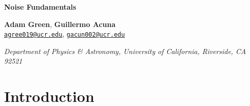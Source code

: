 \documentclass[12pt]{article}
\newcommand{\red}[1]{\textbf{\textcolor{myred1}{#1}}} %
\newcommand{\email}[1]{\href{mailto:#1}{\textcolor{mygreen1}{#1}}}
\newenvironment{institutions}[1][2em]{\begin{list}{}{\setlength\leftmargin{#1}\setlength\rightmargin{#1}}\item[]}{\end{list}}
\begin{document}
	\begin{center}
		
		{\LARGE \bf Noise Fundamentals}\\
		
		\vspace{0.5cm}
		
		\textbf{Adam Green}, \textbf{Guillermo Acuna}\\
		
		\texttt{\footnotesize \email{agree019@ucr.edu}},
		\texttt{\footnotesize \email{gacun002@ucr.edu}}
		
		\vspace{0.5cm}
		
		
		\begin{institutions}[2.25cm]
			\footnotesize
			{\it 
				Department of Physics \& Astronomy, 
				University of  California, Riverside, 
				CA 92521	    
			}    
		\end{institutions}
		
		\vspace{0.5cm}
	\end{center}

	\vspace{0.5cm}
	
	\begin{abstract}
		In this experiment we utilize Johnson and shot noise to measure Boltzmann's constant and the fundamental electric charge. For Johnson noise, we find that the data obeys Nyquist's theorem and we measure the power spectral density against resistance and temperature. From these measurements we extract Boltzmann's constant to be \red{kb}. For shot noise, we measure the power spectral density against bandwidth and photodiode current. Similarly, we find that the data obeys the linear relationship predicted by Schottky's theorem. From this, we extract the fundamental electric charge to be \red{e}.
	\end{abstract}
	
	\tableofcontents

	\pagebreak

	\section{Introduction}
	
\end{document}
